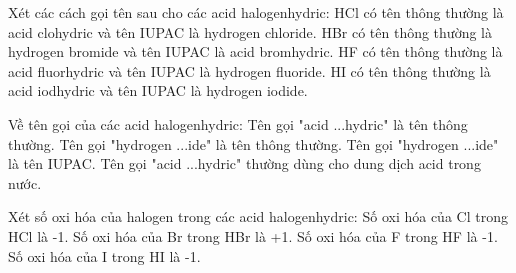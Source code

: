 \documentclass[Main.tex]{subfiles}
\begin{document}
    \begin{ex}
    Xét các cách gọi tên sau cho các acid halogenhydric:
    \choiceTF
    {\True HCl có tên thông thường là acid clohydric và tên IUPAC là hydrogen chloride.}
    {HBr có tên thông thường là hydrogen bromide và tên IUPAC là acid bromhydric.}
    {\True HF có tên thông thường là acid fluorhydric và tên IUPAC là hydrogen fluoride.}
    {\True HI có tên thông thường là acid iodhydric và tên IUPAC là hydrogen iodide.}
    \end{ex}
    
    \begin{ex}
    Về tên gọi của các acid halogenhydric:
    \choiceTF
    {\True Tên gọi "acid ...hydric" là tên thông thường.}
    {Tên gọi "hydrogen ...ide" là tên thông thường.}
    {\True Tên gọi "hydrogen ...ide" là tên IUPAC.}
    {\True Tên gọi "acid ...hydric" thường dùng cho dung dịch acid trong nước.}
    \end{ex}
    
    \begin{ex}
    Xét số oxi hóa của halogen trong các acid halogenhydric:
    \choiceTF
    {\True Số oxi hóa của Cl trong HCl là -1.}
    {Số oxi hóa của Br trong HBr là +1.}
    {\True Số oxi hóa của F trong HF là -1.}
    {\True Số oxi hóa của I trong HI là -1.}
    \end{ex}
    
\end{document}
